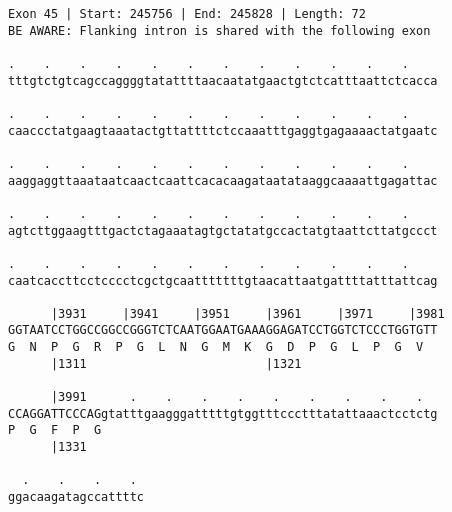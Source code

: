 \documentclass{article}
\begin{document}
\begin{Verbatim}
Exon 45 | Start: 245756 | End: 245828 | Length: 72
BE AWARE: Flanking intron is shared with the following exon
 
.    .    .    .    .    .    .    .    .    .    .    .    
tttgtctgtcagccaggggtatattttaacaatatgaactgtctcatttaattctcacca
  
.    .    .    .    .    .    .    .    .    .    .    .    
caaccctatgaagtaaatactgttattttctccaaatttgaggtgagaaaactatgaatc
  
.    .    .    .    .    .    .    .    .    .    .    .    
aaggaggttaaataatcaactcaattcacacaagataatataaggcaaaattgagattac
  
.    .    .    .    .    .    .    .    .    .    .    .    
agtcttggaagtttgactctagaaatagtgctatatgccactatgtaattcttatgccct
  
.    .    .    .    .    .    .    .    .    .    .    .    
caatcaccttcctcccctcgctgcaatttttttgtaacattaatgattttatttattcag
  
      |3931     |3941     |3951     |3961     |3971     |3981
GGTAATCCTGGCCGGCCGGGTCTCAATGGAATGAAAGGAGATCCTGGTCTCCCTGGTGTT
G  N  P  G  R  P  G  L  N  G  M  K  G  D  P  G  L  P  G  V  
      |1311                         |1321                   
  
      |3991      .    .    .    .    .    .    .    .    .  
CCAGGATTCCCAGgtatttgaagggatttttgtggtttccctttatattaaactcctctg
P  G  F  P  G                                               
      |1331                                                 
  
  .    .    .    . 
ggacaagatagccattttc
\end{Verbatim}
\newpage
\end{document}
